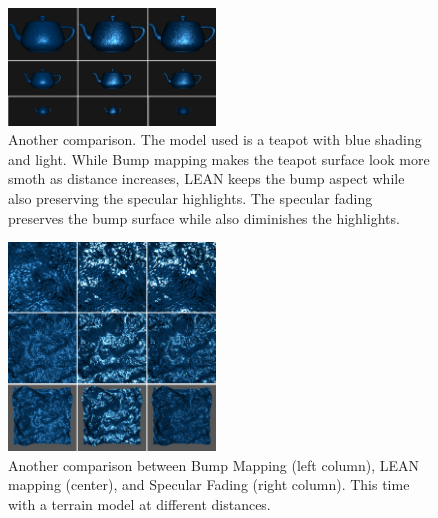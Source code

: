 \documentclass[10pt, conference]{IEEEtran}
\begin{document}


%
%




\begin{figure}[h]
	\includegraphics[width=0.49\textwidth]{figs/BLS5.png}
	\caption{Another comparison. The model used is a teapot with blue shading and light. While Bump mapping makes the teapot surface look more smoth as distance increases, LEAN keeps the bump aspect while also preserving the specular highlights. The specular fading preserves the bump surface while also diminishes the highlights.}
	\label{fig:BLS5}
\end{figure}

\begin{figure}[h]
	\includegraphics[width=0.49\textwidth]{figs/BLS6.png}
	\caption{Another comparison between Bump Mapping (left column), LEAN mapping (center), and Specular Fading (right column). This time with a terrain model at different distances.}
	\label{fig:BLS6}
\end{figure}
\end{document}
